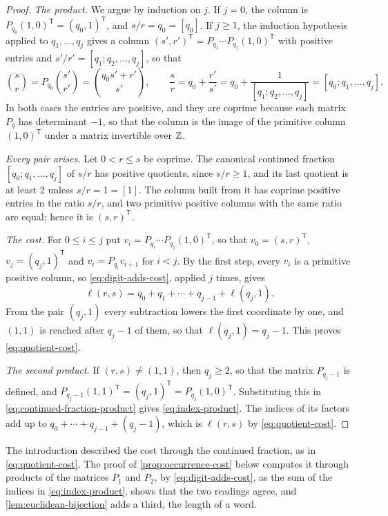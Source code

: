 \begin{proof}
\emph{The product.} We argue by induction on $j$. If $j=0$, the column is
$P_{q_0}(1,0)^{\mathsf T}=(q_0,1)^{\mathsf T}$, and $s/r=q_0=[q_0]$. If $j\geqslant1$,
the induction hypothesis applied to $q_1,\ldots,q_j$ gives a column
$(s',r')^{\mathsf T}=P_{q_1}\cdots P_{q_j}(1,0)^{\mathsf T}$ with positive entries and
$s'/r'=[q_1;q_2,\ldots,q_j]$, so that
$$
 \binom sr=P_{q_0}\binom{s'}{r'}=\binom{q_0s'+r'}{s'},\qquad
 \frac sr=q_0+\frac{r'}{s'}=q_0+\frac1{[q_1;q_2,\ldots,q_j]}=[q_0;q_1,\ldots,q_j].
$$
In both cases the entries are positive, and they are coprime because each
matrix $P_q$ has determinant $-1$, so that the column is the image of the
primitive column $(1,0)^{\mathsf T}$ under a matrix invertible over $\mathbb{Z}$.

\emph{Every pair arises.} Let $0<r\leqslant s$ be coprime. The canonical
continued fraction $[q_0;q_1,\ldots,q_j]$ of $s/r$ has positive quotients, since
$s/r\geqslant1$, and its last quotient is at least $2$ unless $s/r=1=[1]$. The
column built from it has coprime positive entries in the ratio $s/r$, and two
primitive positive columns with the same ratio are equal; hence it is
$(s,r)^{\mathsf T}$.

\emph{The cost.} For $0\leqslant i\leqslant j$ put
$v_i=P_{q_i}\cdots P_{q_j}(1,0)^{\mathsf T}$, so that $v_0=(s,r)^{\mathsf T}$,
$v_j=(q_j,1)^{\mathsf T}$ and $v_i=P_{q_i}v_{i+1}$ for $i<j$. By the first step,
every $v_i$ is a primitive positive column, so \eqref{eq:digit-adds-cost},
applied $j$ times, gives
$$
 \ell(r,s)=q_0+q_1+\cdots+q_{j-1}+\ell(q_j,1).
$$
From the pair $(q_j,1)$ every subtraction lowers the first coordinate by one,
and $(1,1)$ is reached after $q_j-1$ of them, so that $\ell(q_j,1)=q_j-1$. This
proves \eqref{eq:quotient-cost}.

\emph{The second product.} If $(r,s)\neq(1,1)$, then $q_j\geqslant2$, so that the
matrix $P_{q_j-1}$ is defined, and
$P_{q_j-1}(1,1)^{\mathsf T}=(q_j,1)^{\mathsf T}=P_{q_j}(1,0)^{\mathsf T}$. Substituting
this in \eqref{eq:continued-fraction-product} gives \eqref{eq:index-product}.
The indices of its factors add up to $q_0+\cdots+q_{j-1}+(q_j-1)$, which is
$\ell(r,s)$ by \eqref{eq:quotient-cost}.
\end{proof}

The introduction described the cost through the continued fraction, as in
\eqref{eq:quotient-cost}. The proof of \cref{prop:occurrence-cost} below
computes it through products of the matrices $P_1$ and $P_2$, by
\eqref{eq:digit-adds-cost}, as the sum of the indices in
\eqref{eq:index-product}.  shows that the two
readings agree, and \cref{lem:euclidean-bijection} adds a third, the
length of a word.


